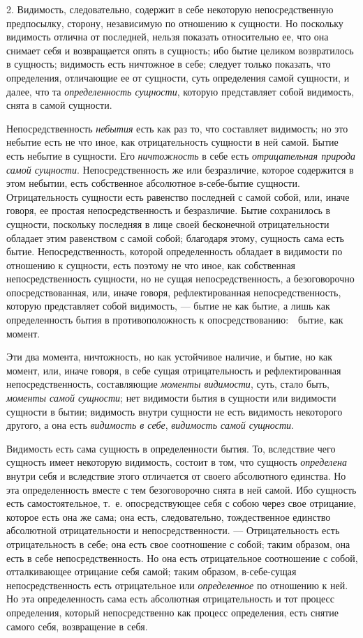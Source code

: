 2. Видимость, следовательно, содержит в себе некоторую непосредственную
предпосылку, сторону, независимую по отношению к сущности. Но поскольку
видимость отлична от последней, нельзя показать относительно ее, что она
снимает себя и возвращается опять в сущность; ибо бытие целиком
возвратилось в сущность; видимость есть ничтожное в себе; следует только
показать, что определения, отличающие ее от сущности, суть определения
самой сущности, и далее, что та {\em определенность
сущности}, которую представляет собой видимость, снята в самой сущности.

Непосредственность {\em небытия} есть как раз то, что
составляет видимость; но это небытие есть не что иное, как отрицательность
сущности в ней самой. Бытие есть небытие в сущности. Его
{\em ничтожность} в себе есть
{\em отрицательная природа самой сущности}.
Непосредственность же или безразличие, которое содержится в этом небытии,
есть собственное абсолютное в-себе-бытие сущности. Отрицательность сущности
есть равенство последней с самой собой, или, иначе говоря, ее простая
непосредственность и безразличие. Бытие сохранилось в сущности, поскольку
последняя в лице своей бесконечной отрицательности обладает этим равенством
с самой собой; благодаря этому, сущность сама есть бытие.
Непосредственность, которой определенность обладает в видимости по
отношению к сущности, есть поэтому не что иное, как собственная
непосредственность сущности, но не сущая непосредственность, а
безоговорочно опосредствованная, или, иначе говоря, рефлектированная
непосредственность, которую представляет собой видимость, — бытие не как
бытие, а лишь как определенность бытия в противоположность к
опосредствованию:\ \ бытие, как момент.

Эти два момента, ничтожность, но как устойчивое наличие, и бытие, но как
момент, или, иначе говоря, в себе сущая отрицательность и рефлектированная
непосредственность, составляющие {\em моменты
видимости}, суть, стало быть, {\em моменты самой
сущности}; нет видимости бытия в сущности или видимости сущности в бытии;
видимость внутри сущности не есть видимость некоторого другого, а она есть
{\em видимость в себе},
{\em видимость самой сущности}.

Видимость есть сама сущность в определенности бытия. То, вследствие чего
сущность имеет некоторую видимость, состоит в том, что сущность
{\em определена} внутри себя и вследствие этого
отличается от своего абсолютного единства. Но эта определенность вместе с
тем безоговорочно снята в ней самой. Ибо сущность есть самостоятельное,
т.~е. опосредствующее себя с собою через свое отрицание, которое есть она
же сама; она есть, следовательно, тождественное единство абсолютной
отрицательности и непосредственности. — Отрицательность есть
отрицательность в себе; она есть свое соотношение с собой; таким образом,
она есть в себе непосредственность. Но она есть отрицательное соотношение с
собой, отталкивающее отрицание себя самой; таким образом, в-себе-сущая
непосредственность есть отрицательное или
{\em определенное} по отношению к ней. Но эта
определенность сама есть абсолютная отрицательность и тот процесс
определения, который непосредственно как процесс определения, есть снятие
самого себя, возвращение в себя.

